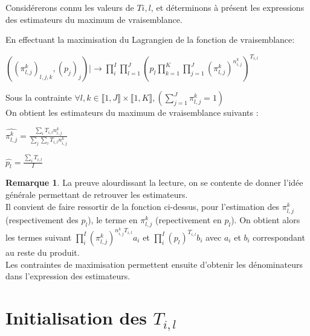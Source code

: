 \documentclass[frenchb]{report}
\newcommand{\1}{\mathbbm{1}}
\theoremstyle{definition}\newtheorem{defn}{Définition}
\theoremstyle{definition}\newtheorem{exm}{Exemple}
\theoremstyle{definition}\newtheorem{nota}{Notation}
\theoremstyle{definition}\newtheorem{rem}{Remarque}
\begin{document}
\newpage

Considérerons connu les valeurs de $T{i,l}$, et déterminons à présent les expressions des estimateurs du maximum de vraisemblance.
\bigskip

En effectuant la maximisation du Lagrangien de la fonction de vraisemblance: 

\begin{center}
	$\left( \left(\pi^k_{l,j}\right)_{l,j,k},(p_j)_j \right) |  \!\!\! \longrightarrow \displaystyle \prod_i^I \displaystyle \prod_{l=1}^J \left( p_l \displaystyle \prod_{k=1}^K \displaystyle \prod_{j = 1}^J \left(\pi^k_{l,j}\right)^{n^k_{i,j}} \right)^{T_{i,l}}$
\end{center}

Sous la contrainte $\forall l,k \in  \llbracket 1,J \rrbracket \times  \llbracket 1,K \rrbracket, \left(\displaystyle \sum_{j = 1}^J \pi^k_{l,j} = 1 \right)$\\

On obtient les estimateurs du maximum de vraisemblance suivants : \\

\begin{center} 
	$\widehat{\pi^{k}_{l,j}} = \displaystyle \frac{\displaystyle \sum_i T_{i,l} n^k_{i,j}}{\displaystyle \sum_j \displaystyle \sum_i T_{i,l} n^k_{i,j}}$
\end{center}
\begin{center}
	$\widehat{p_l} = \displaystyle \frac{\displaystyle \sum_i T_{i,l}}{I}$
\end{center}

\begin{rem}
	La preuve alourdissant la lecture, on se contente de donner l'idée générale permettant de retrouver les estimateurs. \\
Il convient de faire ressortir de la fonction ci-dessus, pour l'estimation des $\pi^k_{l,j}$ (respectivement des $p_l$), le terme en $\pi^k_{l,j}$ (repectivement en $p_l$). On obtient alors les termes suivant $\displaystyle \prod_i^I \left(\pi^k_{l,j}\right)^{n^k_{i,j}T_{i,l}} a_i$ et $\displaystyle \prod_i^I (p_l)^{T_{i,l}} b_i$ avec $a_i$ et $b_i$ correspondant au reste du produit.\\
Les contraintes de maximisation permettent ensuite d'obtenir les dénominateurs dans l'expression des estimateurs. 
\end{rem}
\bigskip
\bigskip
\bigskip





\section{Initialisation des $T_{i,l}$}
\end{document}
